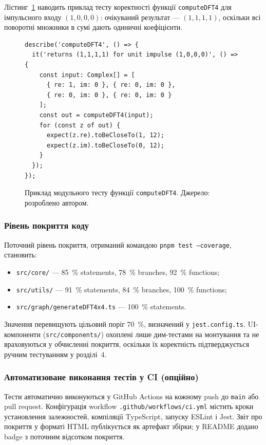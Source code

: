 Лістинг~\ref{lst:test_example} наводить приклад тесту коректності
функції \texttt{computeDFT4} для імпульсного входу $(1, 0, 0, 0)$:
очікуваний результат --- $(1, 1, 1, 1)$, оскільки всі поворотні
множники в сумі дають одиничні коефіцієнти.

\begin{figure}[H]
\begin{verbatim}
describe('computeDFT4', () => {
  it('returns (1,1,1,1) for unit impulse (1,0,0,0)', () => {
    const input: Complex[] = [
      { re: 1, im: 0 }, { re: 0, im: 0 },
      { re: 0, im: 0 }, { re: 0, im: 0 }
    ];
    const out = computeDFT4(input);
    for (const z of out) {
      expect(z.re).toBeCloseTo(1, 12);
      expect(z.im).toBeCloseTo(0, 12);
    }
  });
});
\end{verbatim}
\caption{Приклад модульного тесту функції \texttt{computeDFT4}.
         Джерело: розроблено автором.}
\label{lst:test_example}
\end{figure}

\subsubsection*{Рівень покриття коду}

Поточний рівень покриття, отриманий командою \texttt{pnpm test
--coverage}, становить:

\begin{itemize}
  \item \texttt{src/core/} --- 85~\% statements, 78~\% branches,
        92~\% functions;
  \item \texttt{src/utils/} --- 91~\% statements, 84~\% branches,
        100~\% functions;
  \item \texttt{src/graph/generateDFT4x4.ts} --- 100~\% statements.
\end{itemize}

Значення перевищують цільовий поріг 70~\%, визначений у
\texttt{jest.config.ts}. UI-компоненти (\texttt{src/components/})
охоплені лише дим-тестами на монтування та не враховуються у
обчисленні покриття, оскільки їх коректність підтверджується
ручним тестуванням у розділі~4.

\subsubsection*{Автоматизоване виконання тестів у CI (опційно)}

Тести автоматично виконуються у GitHub Actions на кожному push до
\texttt{main} або pull request. Конфігурація workflow
\texttt{.github/workflows/ci.yml} містить кроки установлення
залежностей, компіляції TypeScript, запуску ESLint і Jest. Звіт
про покриття у форматі HTML публікується як артефакт збірки; у
README додано badge з поточним відсотком покриття.


